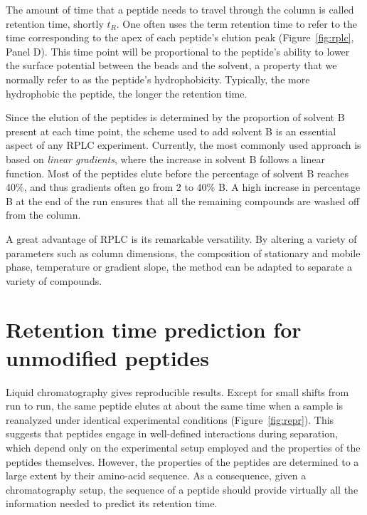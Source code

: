 \documentclass[a4paper]{article}
\begin{document}
The amount of time that a peptide needs to travel through the column
is called retention time, shortly $t_R$. One often uses the term
retention time to refer to the time corresponding to the apex of each
peptide's elution peak (Figure~\ref{fig:rplc}, Panel D). This time
point will be proportional to the peptide's ability to lower the
surface potential between the beads and the solvent, a property that
we normally refer to as the peptide's hydrophobicity.  Typically, the
more hydrophobic the peptide, the longer the retention time.

Since the elution of the peptides is determined by the proportion of
solvent B present at each time point, the scheme used to add solvent B
is an essential aspect of any RPLC experiment. Currently, the most
commonly used approach is based on {\em linear gradients}, where
the increase in solvent B follows a linear function. Most of the
peptides elute before the percentage of solvent B reaches 40\%, and
thus gradients often go from 2 to 40\% B. A high increase in
percentage B at the end of the run ensures that all the remaining
compounds are washed off from the column.

A great advantage of RPLC is its remarkable versatility. By altering a
variety of parameters such as column dimensions, the composition of
stationary and mobile phase, temperature or gradient slope, the method
can be adapted to separate a variety of compounds.

\section{\label{sec:rtpred}Retention time prediction for unmodified peptides}

Liquid chromatography gives reproducible results. Except for small
shifts from run to run, the same peptide elutes at about the same time
when a sample is reanalyzed under identical experimental conditions
(Figure~\ref{fig:repr}). This suggests that peptides engage in
well-defined interactions during separation, which depend only on the
experimental setup employed and the properties of the peptides
themselves. However, the properties of the peptides are determined to
a large extent by their amino-acid sequence. As a consequence, given a
chromatography setup, the sequence of a peptide should provide
virtually all the information needed to predict its retention time.
\end{document}
